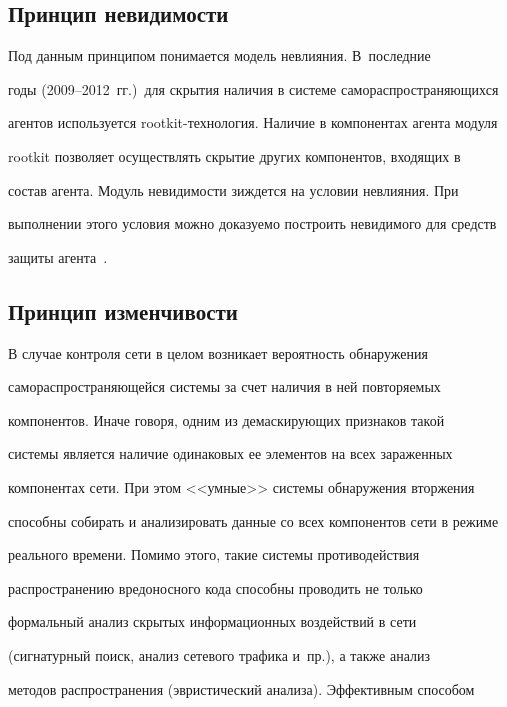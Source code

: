 \subsection{Принцип невидимости} %


     


     Под данным принципом понимается модель невлияния. В~последние 


годы (2009--2012~гг.)\ для скрытия наличия в системе самораспространяющихся 


агентов используется rootkit-технология. Наличие в компонентах агента модуля 


rootkit позволяет осуществлять скрытие других компонентов, входящих в 


состав агента. Модуль невидимости зиждется на условии невлияния. При 


выполнении этого условия можно доказуемо построить невидимого для средств 


защиты агента~\cite{1-lev}.





\subsection{Принцип изменчивости} %


     


     В случае контроля сети в целом возникает вероятность обнаружения 


самораспространяющейся системы за счет наличия в ней повторяемых 


компонентов. Иначе говоря, одним из демаскирующих признаков такой 


системы является наличие одинаковых ее элементов на всех зараженных 


компонентах сети. При этом <<умные>> системы обнаружения вторжения 


способны собирать и анализировать данные со всех компонентов сети в режиме 


реального времени. Помимо этого, такие системы противодействия 


распространению вредоносного кода способны проводить не только 


формальный анализ скрытых информационных воздействий в сети 


(сигнатурный поиск, анализ сетевого трафика и~пр.), а также анализ 


методов распространения (эвристический анализа). Эффективным способом 


